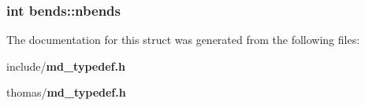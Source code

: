 \subsubsection{\setlength{\rightskip}{0pt plus 5cm}int {\bf bends::nbends}}\label{structbends_62c37dc85fcd9803a05b34c0ab6f86e6}




The documentation for this struct was generated from the following files:\begin{CompactItemize}
\item 
include/{\bf md\_\-typedef.h}\item 
thomas/{\bf md\_\-typedef.h}\end{CompactItemize}
